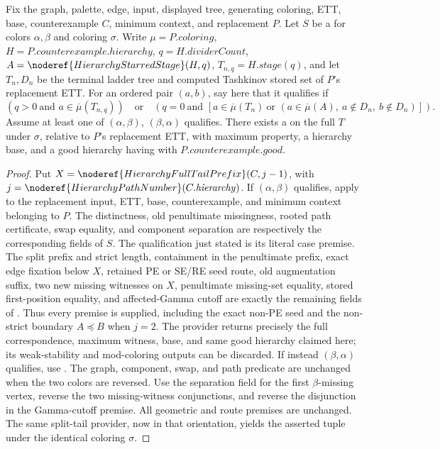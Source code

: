 \begin{lemma}
Fix the graph, palette, edge, input, displayed tree, generating coloring,
ETT, base, counterexample \(C\), minimum context, and replacement \(P\).
Let \(S\) be a  for colors
\(\alpha,\beta\) and coloring \(\sigma\).
Write \(\mu=P.\mathit{coloring}\), \(H=P.\mathit{counterexample.hierarchy}\),
\(q=H.\mathit{dividerCount}\), \(A=\noderef{HierarchyStarredStage}(H,q)\),
\(T_{n,q}=H.\mathit{stage}(q)\), and let \(T_n,D_n\) be the terminal
ladder tree and computed Tashkinov stored set of \(P\)'s replacement ETT.
For an ordered pair \((a,b)\), say here that it qualifies if
\[
 (q>0\ \text{and }a\in\overline\mu(T_{n,q}))
 \quad\text{or}\quad
 (q=0\ \text{and }[a\in\overline\mu(T_n)\ \text{or }
 (a\in\overline\mu(A),\ a\notin D_n,\ b\notin D_n)]).
\]
Assume at least one of \((\alpha,\beta)\), \((\beta,\alpha)\) qualifies.
There exists a  on the full
\(T\) under \(\sigma\), relative to \(P\)'s replacement ETT, with
maximum property, a hierarchy base, and a good hierarchy having
 with \(P.\mathit{counterexample.good}\).
\end{lemma}
\begin{proof}
Put \(X=\noderef{HierarchyFullTailPrefix}(C,j-1)\), with
\(j=\noderef{HierarchyPathNumber}(C.\mathit{hierarchy})\).
If \((\alpha,\beta)\) qualifies, apply
 to the replacement input,
ETT, base, counterexample, and minimum context belonging to \(P\).
The distinctness, old penultimate missingness, rooted path certificate,
swap equality, and component separation are respectively the corresponding
fields of \(S\). The qualification just stated is its literal case
premise. The split prefix and strict length, containment in the penultimate
prefix, exact edge fixation below \(X\), retained PE or SE/RE seed route,
old augmentation suffix, two new missing witnesses on \(X\),
penultimate missing-set equality, stored first-position equality, and
affected-Gamma cutoff are exactly the remaining fields of
. Thus every premise is supplied,
including the exact non-PE seed and the non-strict boundary
\(A\preccurlyeq B\) when \(j=2\). The provider returns precisely
the full correspondence, maximum witness, base, and same good hierarchy
claimed here; its weak-stability and mod-coloring outputs can be discarded.
If instead \((\beta,\alpha)\) qualifies, use
. The graph, component, swap, and
path predicate are unchanged when the two colors are reversed.
Use the separation field for the first \(\beta\)-missing vertex,
reverse the two missing-witness conjunctions, and reverse the disjunction
in the Gamma-cutoff premise. All geometric and route premises are
unchanged. The same split-tail provider, now in that orientation, yields
the asserted tuple under the identical coloring \(\sigma\).
\end{proof}
